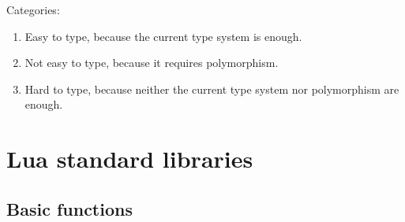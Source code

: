\documentclass{paper}
\begin{document}
Categories:
\begin{enumerate}
\item Easy to type, because the current type system is enough.
\item Not easy to type, because it requires polymorphism.
\item Hard to type, because neither the current type system nor
      polymorphism are enough.
\end{enumerate}

\section{Lua standard libraries}

\subsection{Basic functions}
\end{document}
